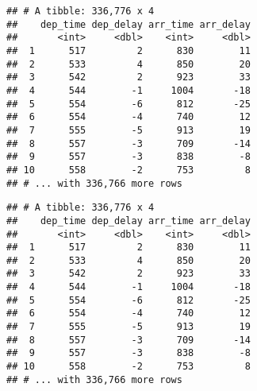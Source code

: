\documentclass[
]{book}
\newenvironment{Shaded}{\begin{snugshade}}{\end{snugshade}}
\newcommand{\CommentTok}[1]{\textcolor[rgb]{0.56,0.35,0.01}{\textit{#1}}}
\newcommand{\DecValTok}[1]{\textcolor[rgb]{0.00,0.00,0.81}{#1}}
\newcommand{\KeywordTok}[1]{\textcolor[rgb]{0.13,0.29,0.53}{\textbf{#1}}}
\newcommand{\NormalTok}[1]{#1}
\newcommand{\OperatorTok}[1]{\textcolor[rgb]{0.81,0.36,0.00}{\textbf{#1}}}
\newcommand{\StringTok}[1]{\textcolor[rgb]{0.31,0.60,0.02}{#1}}
\begin{document}
\begin{Shaded}
\end{Shaded}

\begin{verbatim}
## # A tibble: 336,776 x 4
##    dep_time dep_delay arr_time arr_delay
##       <int>     <dbl>    <int>     <dbl>
##  1      517         2      830        11
##  2      533         4      850        20
##  3      542         2      923        33
##  4      544        -1     1004       -18
##  5      554        -6      812       -25
##  6      554        -4      740        12
##  7      555        -5      913        19
##  8      557        -3      709       -14
##  9      557        -3      838        -8
## 10      558        -2      753         8
## # ... with 336,766 more rows
\end{verbatim}

\begin{Shaded}
\end{Shaded}

\begin{verbatim}
## # A tibble: 336,776 x 4
##    dep_time dep_delay arr_time arr_delay
##       <int>     <dbl>    <int>     <dbl>
##  1      517         2      830        11
##  2      533         4      850        20
##  3      542         2      923        33
##  4      544        -1     1004       -18
##  5      554        -6      812       -25
##  6      554        -4      740        12
##  7      555        -5      913        19
##  8      557        -3      709       -14
##  9      557        -3      838        -8
## 10      558        -2      753         8
## # ... with 336,766 more rows
\end{verbatim}

\begin{Shaded}
\end{Shaded}
\end{document}
